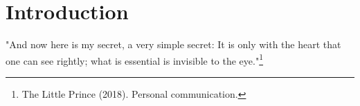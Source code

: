 \section{Introduction}
  \label{sec:Intro}
{\centering
"And now here is my secret, a very simple secret: It is only with the heart that one can see rightly; what is essential is invisible to the eye."\footnote{The Little Prince (2018). Personal communication.}	\par
}

\lipsum[1-3]

\newpage
